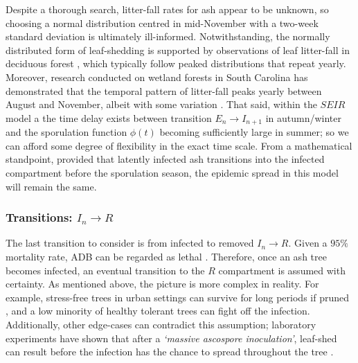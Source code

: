 Despite a thorough search, litter-fall rates for ash appear to be unknown, so choosing a normal distribution centred in mid-November with a two-week standard deviation is ultimately ill-informed.
Notwithstanding, the normally distributed form of leaf-shedding is supported by observations of leaf litter-fall in deciduous forest \cite{zhang2014seasonal, dixon1976analysis}, 
which typically follow peaked distributions that repeat yearly.
Moreover, research conducted on wetland forests in South Carolina has demonstrated that the temporal pattern of litter-fall peaks yearly between August and November, albeit with some variation \cite{shure1985litter}.
That said, within the $SEIR$ model a the time delay exists between transition $E_n \rightarrow I_{n+1}$ in autumn/winter and the sporulation function $\phi(t)$ becoming sufficiently large in summer;
so we can afford some degree of flexibility in the exact time scale.
From a mathematical standpoint, provided that latently infected ash transitions into the infected compartment before the sporulation season,
the epidemic spread in this model will remain the same.


\subsubsection{Transitions: $I_n\rightarrow R$}

The last transition to consider is from infected to removed $I_{n}\rightarrow R$. Given a $95\%$ mortality rate, ADB can be regarded as lethal \cite{ash-dieback-costs}.
Therefore, once an ash tree becomes infected, an eventual transition to the $R$ compartment is assumed with certainty.
As mentioned above, the picture is more complex in reality. 
For example, stress-free trees in urban settings can survive for long periods if pruned \cite{marciulyniene2017can}, and a low minority of healthy tolerant trees can fight off the infection.
Additionally, other edge-cases can contradict this assumption;
laboratory experiments have shown that after a \textit{`massive ascospore inoculation'}, leaf-shed can result before the infection has the chance to spread throughout the tree \cite{https://doi.org/10.1111/mpp.12073}.


